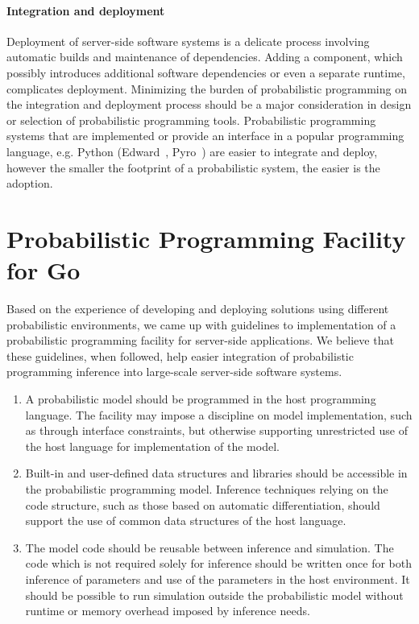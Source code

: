 \documentclass[sigplan,review]{acmart}\settopmatter{printfolios=true,printccs=false,printacmref=false}
\begin{document}
\begin{sloppypar}
\paragraph{Integration and deployment} Deployment of server-side
software systems is a delicate process involving automatic
builds and maintenance of dependencies. Adding  a component,
which possibly introduces additional software dependencies or
even a separate runtime, complicates deployment. Minimizing the
burden of probabilistic programming on the integration
and deployment process should be a major consideration in
design or selection of probabilistic programming tools.
Probabilistic programming systems that are implemented or 
provide an interface in a popular programming language, e.g.
Python (Edward~\cite{THS+17}, Pyro~\cite{Pyro18}) are easier
to integrate and deploy, however the smaller the footprint
of a probabilistic system, the easier is the adoption.

\section{Probabilistic Programming Facility for Go}

Based on the experience of developing and deploying solutions
using different probabilistic environments, we came up with
guidelines to implementation of a probabilistic programming
facility for server-side applications. We believe that these
guidelines, when followed, help easier integration of
probabilistic programming inference into large-scale server-side
software systems.

\begin{enumerate}
\item A probabilistic model should be programmed in the host
programming language. The facility may impose a discipline on
model implementation, such as through interface constraints, but
otherwise supporting unrestricted use of the host language for
implementation of the model.

\item Built-in and user-defined data structures and libraries
should be accessible in the probabilistic programming model.
Inference techniques relying on the code structure, such as
those based on automatic differentiation, should support the
use of common data structures of the host language.

\item The model code should be reusable between inference and
simulation. The code which is not required solely for inference
should be written once for both inference of parameters and use
of the parameters in the host environment.  It should be
possible to run simulation outside the probabilistic model without
runtime or memory overhead imposed by inference needs.
\end{enumerate}


\end{sloppypar}
\end{document}
